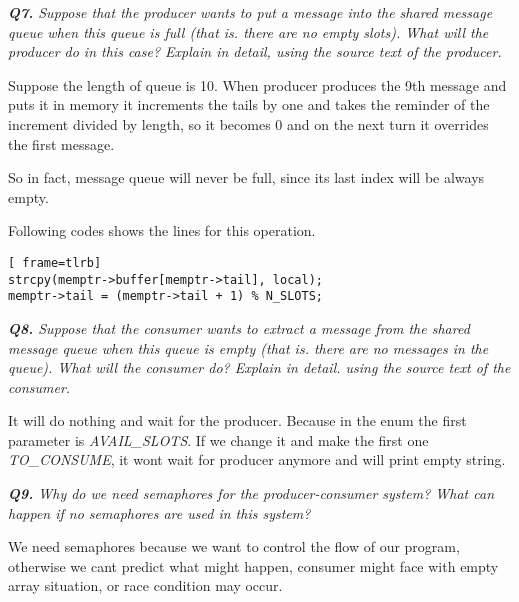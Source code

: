 \documentclass[11pt]{article}
\begin{document}
\vspace{5mm}
\textit{\textbf{Q7.} Suppose that the producer wants to put a message into the shared message queue when this queue is full (that is. there are no empty slots). What will the producer do in this case? Explain in detail, using the source text of the producer.}
\vspace{5mm}

Suppose the length of queue is 10. When producer produces the 9th message and puts it in memory it increments the tails by one and takes the reminder of the increment divided by length, so it becomes 0 and on the next turn it overrides the first message.

So in fact, message queue will never be full, since its last index will be always empty.

Following codes shows the lines for this operation.

\vspace{5mm}
\begin{minipage}{1\textwidth}
\begin{lstlisting}[ frame=tlrb]
strcpy(memptr->buffer[memptr->tail], local);
memptr->tail = (memptr->tail + 1) % N_SLOTS;
\end{lstlisting}
\end{minipage}



\vspace{5mm}
\textit{\textbf{Q8.} Suppose that the consumer wants to extract a message from the shared message queue when this queue is empty (that is. there are no messages in the queue). What will the consumer do? Explain in detail. using the source text of the consumer.}
\vspace{5mm}

It will do nothing and wait for the producer. Because in the enum the first parameter is \textit{AVAIL\_SLOTS}. If we change it and make the first one \textit{TO\_CONSUME}, it wont wait for producer anymore and will print empty string.

\vspace{5mm}
\textit{\textbf{Q9.}  Why do we need semaphores for the producer-consumer system? What can happen if no semaphores are used in this system? }
\vspace{5mm}

We need semaphores because we want to control the flow of our program, otherwise we cant predict what might happen, consumer might face with empty array situation, or race condition may occur.
\end{document}
